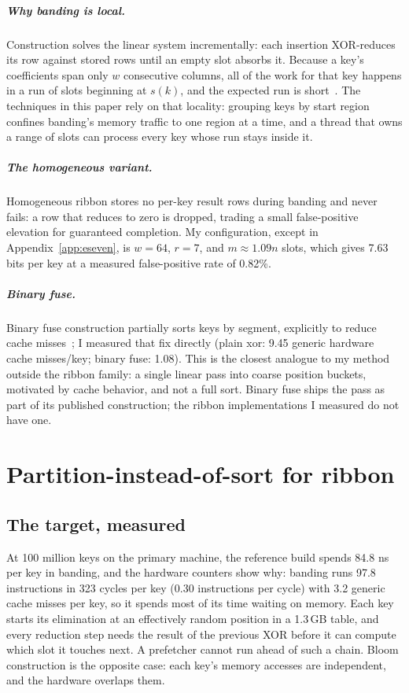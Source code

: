 \documentclass[a4paper,UKenglish,cleveref,autoref,thm-restate,anonymous]{lipics-v2021}
\begin{document}
\subparagraph*{Why banding is local.} Construction solves the linear system incrementally: each insertion XOR-reduces its row against stored rows until an empty slot absorbs it. Because a key's coefficients span only $w$ consecutive columns, all of the work for that key happens in a run of slots beginning at $s(k)$, and the expected run is short~\cite{dillinger2021ribbon}. The techniques in this paper rely on that locality: grouping keys by start region confines banding's memory traffic to one region at a time, and a thread that owns a range of slots can process every key whose run stays inside it.

\subparagraph*{The homogeneous variant.} Homogeneous ribbon stores no per-key result rows during banding and never fails: a row that reduces to zero is dropped, trading a small false-positive elevation for guaranteed completion. My configuration, except in Appendix~\ref{app:eseven}, is $w = 64$, $r = 7$, and $m \approx 1.09n$ slots, which gives 7.63 bits per key at a measured false-positive rate of 0.82\%.

\subparagraph*{Binary fuse.} Binary fuse construction partially sorts keys by segment, explicitly to reduce cache misses~\cite{graf2022binaryfuse}; I measured that fix directly (plain xor: 9.45 generic hardware cache misses/key; binary fuse: 1.08). This is the closest analogue to my method outside the ribbon family: a single linear pass into coarse position buckets, motivated by cache behavior, and not a full sort. Binary fuse ships the pass as part of its published construction; the ribbon implementations I measured do not have one.

\section{Partition-instead-of-sort for ribbon}\label{sec:ribbon}
\subsection{The target, measured}
At 100 million keys on the primary machine, the reference build spends 84.8 ns per key
in banding, and the hardware counters show why: banding runs 97.8 instructions in
323 cycles per key (0.30 instructions per cycle) with 3.2
generic cache misses per key, so it spends most of its time waiting on memory. Each key starts its elimination at an
effectively random position in a 1.3\,GB table, and every reduction step needs the result of the
previous XOR before it can compute which slot it touches next. A prefetcher cannot run
ahead of such a chain. Bloom construction is the opposite case: each
key's memory accesses are independent, and the hardware overlaps them.
\end{document}
